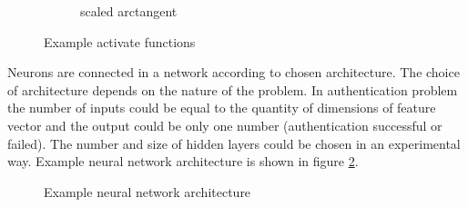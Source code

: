 \documentclass[magister]{dyplom}
\begin{document}
\begin{figure}
\begin{subfigure}{.33\textwidth}
			\caption{scaled arctangent}
		\end{subfigure}
		\caption{Example activate functions}
		\label{fig:activate_functions}
	\end{figure}
	
	Neurons are connected in a network according to chosen architecture. The choice of architecture depends on the nature of the problem. In authentication problem the number of inputs could be equal to the quantity of dimensions of feature vector and the output could be only one number (authentication successful or failed). The number and size of hidden layers could be chosen in an experimental way. Example neural network architecture is shown in figure \ref{fig:neural_network_architecture}. \\
	
	\begin{figure} [!th]
		\centering
			\caption{Example neural network architecture \cite{neural_network_diagrams}}
			\label{fig:neural_network_architecture}
	\end{figure}
	
\end{document}
